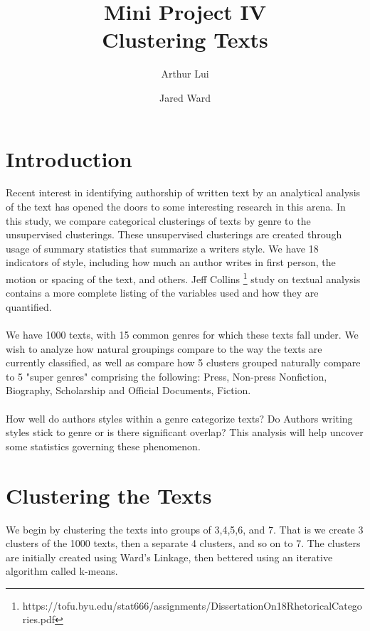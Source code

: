 \documentclass[11pt]{article}
\begin{document}
\onehalfspacing

\title{Mini Project IV \\
Clustering Texts} 
\author{Arthur Lui \and Jared Ward}

\maketitle

\section*{Introduction}
Recent interest in identifying authorship of written text by an analytical analysis of the text has opened the doors to some interesting research in this arena. In this study, we compare categorical clusterings of texts by genre to the unsupervised clusterings. These unsupervised clusterings are created through usage of summary statistics that summarize a writers style. We have 18 indicators of style, including how much an author writes in first person, the motion or spacing of the text, and others.  Jeff Collins \footnote{https://tofu.byu.edu/stat666/assignments/DissertationOn18RhetoricalCategories.pdf} study on textual analysis contains a more complete listing of the variables used and how they are quantified. 
\\
\\
We have 1000 texts, with 15 common genres for which these texts fall under. We wish to analyze how natural groupings compare to the way the texts are currently classified, as well as compare how 5 clusters grouped naturally compare to 5 "super genres" comprising the following: Press, Non-press Nonfiction, Biography, Scholarship and Official Documents, Fiction. 
\\
\\
How well do authors styles within a genre categorize texts? Do Authors writing styles stick to genre or is there significant overlap? This analysis will help uncover some statistics governing these phenomenon.  

\section*{Clustering the Texts}
We begin by clustering the texts into groups of 3,4,5,6, and 7. That is we create 3 clusters of the 1000 texts, then a separate 4 clusters, and so on to 7. The clusters are initially created using Ward's Linkage, then bettered using an iterative algorithm called k-means.
\end{document}
